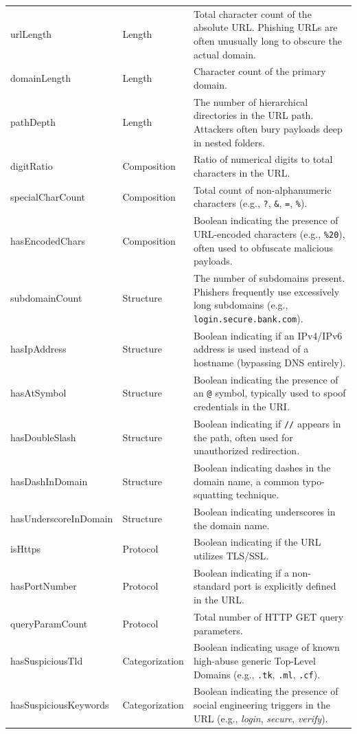 \begin{longtable}{
>{\raggedright\arraybackslash\ttfamily\scriptsize}p{}
>{\raggedright\arraybackslash\footnotesize}p{}
>{\raggedright\arraybackslash\footnotesize}p{}}
\multicolumn{3}{c}{\textbf{Lexical and Structural Features (17 Dimensions)}} \\
\midrule
urlLength & Length & Total character count of the absolute URL. Phishing URLs are often unusually long to obscure the actual domain. \\
domainLength & Length & Character count of the primary domain. \\
pathDepth & Length & The number of hierarchical directories in the URL path. Attackers often bury payloads deep in nested folders. \\
digitRatio & Composition & Ratio of numerical digits to total characters in the URL. \\
specialCharCount & Composition & Total count of non-alphanumeric characters (e.g., \texttt{?}, \texttt{\&}, \texttt{=}, \texttt{\%}). \\
hasEncodedChars & Composition & Boolean indicating the presence of URL-encoded characters (e.g., \texttt{\%20}), often used to obfuscate malicious payloads. \\
subdomainCount & Structure & The number of subdomains present. Phishers frequently use excessively long subdomains (e.g., \texttt{login.secure.bank.com}). \\
hasIpAddress & Structure & Boolean indicating if an IPv4/IPv6 address is used instead of a hostname (bypassing DNS entirely). \\
hasAtSymbol & Structure & Boolean indicating the presence of an \texttt{@} symbol, typically used to spoof credentials in the URI. \\
hasDoubleSlash & Structure & Boolean indicating if \texttt{//} appears in the path, often used for unauthorized redirection. \\
hasDashInDomain & Structure & Boolean indicating dashes in the domain name, a common typo-squatting technique. \\
hasUnderscoreInDomain & Structure & Boolean indicating underscores in the domain name. \\
isHttps & Protocol & Boolean indicating if the URL utilizes TLS/SSL. \\
hasPortNumber & Protocol & Boolean indicating if a non-standard port is explicitly defined in the URL. \\
queryParamCount & Protocol & Total number of HTTP GET query parameters. \\
hasSuspiciousTld & Categorization & Boolean indicating usage of known high-abuse generic Top-Level Domains (e.g., \texttt{.tk}, \texttt{.ml}, \texttt{.cf}). \\
hasSuspiciousKeywords & Categorization & Boolean indicating the presence of social engineering triggers in the URL (e.g., \textit{login}, \textit{secure}, \textit{verify}). \\


\end{longtable}
